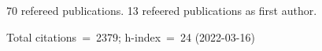 70 refereed publications. 13 refeered publications as first author.

Total citations~=~2379; h-index~=~24 (2022-03-16)